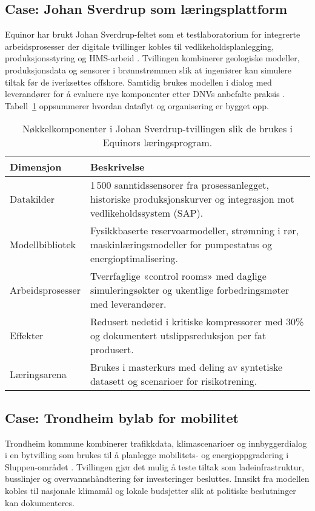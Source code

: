 \subsection{Case: Johan Sverdrup som læringsplattform}
Equinor har brukt Johan Sverdrup-feltet som et testlaboratorium for integrerte arbeidsprosesser der digitale tvillinger kobles til vedlikeholdsplanlegging, produksjonsstyring og HMS-arbeid \citep{equinor2021johansverdrup}. Tvillingen kombinerer geologiske modeller, produksjonsdata og sensorer i brønnstrømmen slik at ingeniører kan simulere tiltak før de iverksettes offshore. Samtidig brukes modellen i dialog med leverandører for å evaluere nye komponenter etter DNVs anbefalte praksis \citep{dnv2021rp}. Tabell~\ref{tab:kap01-johan-sverdrup} oppsummerer hvordan dataflyt og organisering er bygget opp.

\begin{table}[ht]
    \centering
    \caption{Nøkkelkomponenter i Johan Sverdrup-tvillingen slik de brukes i Equinors læringsprogram.}
    \label{tab:kap01-johan-sverdrup}
    \begin{tabular}{p{}p{}}
        \toprule
        \textbf{Dimensjon} & \textbf{Beskrivelse} \\
        \midrule
        Datakilder & 1\,500 sanntidssensorer fra prosessanlegget, historiske produksjonskurver og integrasjon mot vedlikeholdssystem (SAP). \\
        Modellbibliotek & Fysikkbaserte reservoarmodeller, strømning i rør, maskinlæringsmodeller for pumpestatus og energioptimalisering. \\
        Arbeidsprosesser & Tverrfaglige «control rooms» med daglige simuleringsøkter og ukentlige forbedringsmøter med leverandører. \\
        Effekter & Redusert nedetid i kritiske kompressorer med 30\% og dokumentert utslippsreduksjon per fat produsert. \\
        Læringsarena & Brukes i masterkurs med deling av syntetiske datasett og scenarioer for risikotrening. \\
        \bottomrule
    \end{tabular}
\end{table}

\subsection{Case: Trondheim bylab for mobilitet}
Trondheim kommune kombinerer trafikkdata, klimascenarioer og innbyggerdialog i en bytvilling som brukes til å planlegge mobilitets- og energioppgradering i Sluppen-området \citep{trondheim2024bytvilling}. Tvillingen gjør det mulig å teste tiltak som ladeinfrastruktur, busslinjer og overvannshåndtering før investeringer besluttes. Innsikt fra modellen kobles til nasjonale klimamål og lokale budsjetter slik at politiske beslutninger kan dokumenteres.

